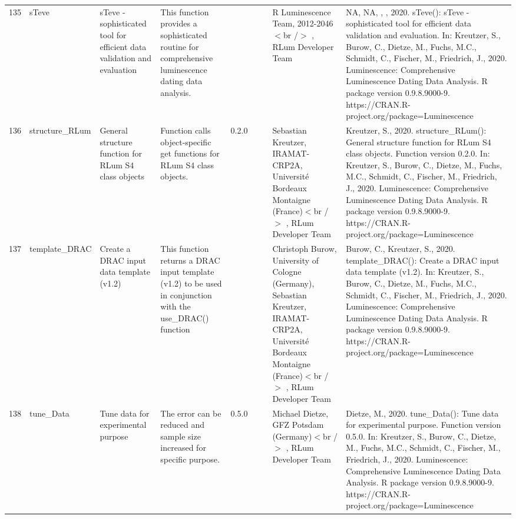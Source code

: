 \begin{table}[ht]
\begin{tabular}{rllllllll}
 \\ 
  135 & sTeve & sTeve - sophisticated tool for efficient data validation and evaluation & This function provides a sophisticated routine for comprehensive luminescence dating data analysis. &  &  &  & R Luminescence Team, 2012-2046$<$br /$>$ , RLum Developer Team & NA, NA, , , 2020. sTeve(): sTeve - sophisticated tool for efficient data validation and evaluation. In: Kreutzer, S., Burow, C., Dietze, M., Fuchs, M.C., Schmidt, C., Fischer, M., Friedrich, J., 2020. Luminescence: Comprehensive Luminescence Dating Data Analysis. R package version 0.9.8.9000-9. https://CRAN.R-project.org/package=Luminescence
 \\ 
  136 & structure\_RLum & General structure function for RLum S4 class objects & Function calls object-specific get functions for RLum S4 class objects. & 0.2.0
 &  &  & Sebastian Kreutzer, IRAMAT-CRP2A, Université Bordeaux Montaigne (France)$<$br /$>$ , RLum Developer Team & Kreutzer, S., 2020. structure\_RLum(): General structure function for RLum S4 class objects. Function version 0.2.0. In: Kreutzer, S., Burow, C., Dietze, M., Fuchs, M.C., Schmidt, C., Fischer, M., Friedrich, J., 2020. Luminescence: Comprehensive Luminescence Dating Data Analysis. R package version 0.9.8.9000-9. https://CRAN.R-project.org/package=Luminescence
 \\ 
  137 & template\_DRAC & Create a DRAC input data template (v1.2) & This function returns a DRAC input template (v1.2) to be used in conjunction with the use\_DRAC() function &  &  &  & Christoph Burow, University of Cologne (Germany), Sebastian Kreutzer, IRAMAT-CRP2A, Université Bordeaux Montaigne (France)$<$br /$>$ , RLum Developer Team & Burow, C., Kreutzer, S., 2020. template\_DRAC(): Create a DRAC input data template (v1.2). In: Kreutzer, S., Burow, C., Dietze, M., Fuchs, M.C., Schmidt, C., Fischer, M., Friedrich, J., 2020. Luminescence: Comprehensive Luminescence Dating Data Analysis. R package version 0.9.8.9000-9. https://CRAN.R-project.org/package=Luminescence
 \\ 
  138 & tune\_Data & Tune data for experimental purpose & The error can be reduced and sample size increased for specific purpose. & 0.5.0
 &  &  & Michael Dietze, GFZ Potsdam (Germany)$<$br /$>$ , RLum Developer Team & Dietze, M., 2020. tune\_Data(): Tune data for experimental purpose. Function version 0.5.0. In: Kreutzer, S., Burow, C., Dietze, M., Fuchs, M.C., Schmidt, C., Fischer, M., Friedrich, J., 2020. Luminescence: Comprehensive Luminescence Dating Data Analysis. R package version 0.9.8.9000-9. https://CRAN.R-project.org/package=Luminescence

\end{tabular}
\end{table}
